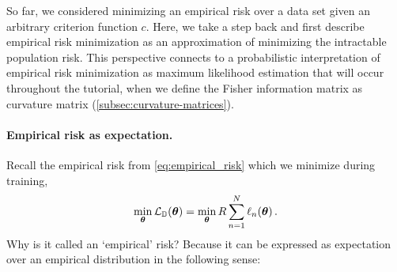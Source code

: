 So far, we considered minimizing an empirical risk over a data set given an arbitrary criterion function $c$.
Here, we take a step back and first describe empirical risk minimization as an approximation of minimizing the intractable population risk.
This perspective connects to a probabilistic interpretation of empirical risk minimization as maximum likelihood estimation that will occur throughout the tutorial, \eg when we define the Fisher information matrix as curvature matrix (\cref{subsec:curvature-matrices}).

\paragraph{Empirical risk as expectation.} Recall the empirical risk from \cref{eq:empirical_risk} which we minimize during training,
\begin{align*}
  \min_{{\bm{\theta}}} {\mathcal{L}}_{{\mathbb{D}}}({\bm{\theta}}) = \min_{{\bm{\theta}}} R \sum_{n=1}^N \ell_n({\bm{\theta}})\,.
\end{align*}
Why is it called an `empirical' risk?
Because it can be expressed as expectation over an empirical distribution in the following sense:

